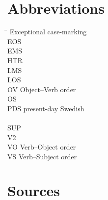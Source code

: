 \documentclass[output=paper]{langscibook}
\begin{document}
\section*{Abbreviations}

\begin{multicols}{2}
\begin{tabbing}
\hspace{1ex} \= \kill
{} \>  Exceptional case-marking    \\
EOS \>  \\
EMS \>  \\
HTR \>  \\
LMS \> \\
LOS \>  \\
OV  \> Object–Verb order \\
OS  \> \\
PDS \>  present-day Swedish\\
 \>  \\
SUP \>  \\
V2  \> \\
VO  \> Verb–Object order\\
VS  \> Verb–Subject order
\end{tabbing}
\end{multicols}

\section*{Sources}
\end{document}
